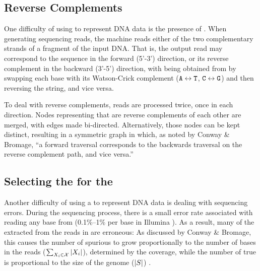 \subsection{Reverse Complements}
\label{subsec:dBG-reversecomplements}

One difficulty of using \dBG to represent DNA data is the presence of . When generating sequencing reads, the machine reads either of the two complementary strands of a fragment of the input DNA. That is, the output read may correspond to the sequence  in the forward (5'-3') direction, or its reverse complement  in the backward (3'-5') direction, with
 being obtained from  by swapping each base with its Watson-Crick complement
($\mathtt{A} \leftrightarrow \mathtt{T}$, $\mathtt{C} \leftrightarrow \mathtt{G}$) and then reversing the string, and vice versa. 

To deal with reverse complements, reads are processed twice, once in each direction. Nodes representing  that are reverse complements of each other are merged, with edges made bi-directed. Alternatively, those nodes can be kept distinct, resulting in a symmetric graph in which, as noted by Conway \& Bromage, ``a forward traversal corresponds to the backwards traversal on the reverse complement path, and vice versa.'' \cite{Conway2011}

\subsection{Selecting the  for the \dBG}
\label{subsec:dBG-selectingkmers}

Another difficulty of using a \dBG to represent DNA data is dealing with sequencing errors. During the sequencing process, there is a small error rate associated with reading any base from  (0.1\%--1\% per base in Illumina \cite{Metzker2010}). As a result, many of the  extracted from the reads in \readset are erroneous: As discussed by Conway \& Bromage, this causes the number of spurious  to grow proportionally to the number of bases in the reads ($\sum_{\strname{X}_i \in \readset} |\strname{X}_i|$), determined by the coverage, while the number of true  is proportional to the size of the genome ($|\strname{S}|$) \cite{Conway2011}.

